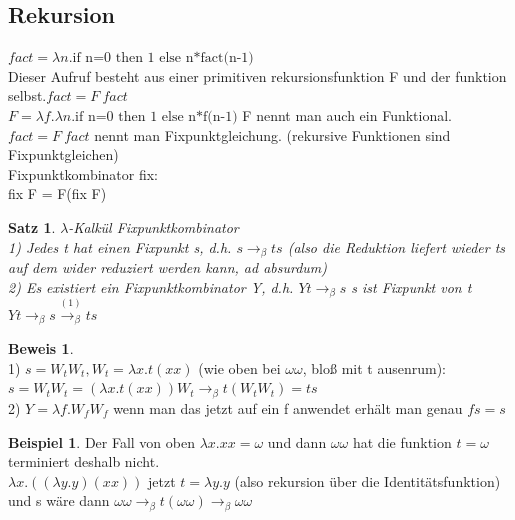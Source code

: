\documentclass{article}
\newtheorem{satz}{Satz}
\theoremstyle{definition}
\newtheorem{beweis}{Beweis}[section]
\newtheorem{beispiel}{Beispiel}[section]
\begin{document}
	\subsection{Rekursion}
	$fact =\lambda n. \text{if n=0 then 1 else n*fact(n-1)}$\\
	Dieser Aufruf besteht aus einer primitiven rekursionsfunktion F und der funktion selbst.$fact = F\ fact$\\
	$F=\lambda f.\lambda n. \text{if n=0 then 1 else n*f(n-1)}$ F nennt man auch ein Funktional.\\
	$fact = F\ fact$ nennt man Fixpunktgleichung. (rekursive Funktionen sind Fixpunktgleichen)\\
	Fixpunktkombinator fix:\\
	fix F = F(fix F)\\
	\begin{satz} $\lambda$-Kalkül Fixpunktkombinator\\
	1) Jedes t hat einen Fixpunkt s, d.h. $s\to_\beta ts$ (also die Reduktion liefert wieder ts auf dem wider reduziert werden kann, ad absurdum)\\
	2) Es existiert ein Fixpunktkombinator Y, d.h. $Yt\to_\beta s$ s ist Fixpunkt von t\\
	$Yt\to_\beta s\stackrel{(1)}{\to_\beta} ts$\\
	\end{satz}
	\begin{beweis} \ \\
	1) $s=W_tW_t, W_t = \lambda x.t(xx)$ (wie oben bei $\omega\omega$, bloß mit t ausenrum):\\
	$s=W_tW_t =(\lambda x.t(xx))W_t\to_\beta t(W_tW_t) = ts$\\
	2) $Y=\lambda f.W_fW_f$ wenn man das jetzt auf ein f anwendet erhält man genau $fs=s$
	\end{beweis}
	\begin{beispiel}
	Der Fall von oben $\lambda x.xx =\omega$ und dann $\omega\omega$ hat die funktion $t=\omega$ terminiert deshalb nicht.\\
	$\lambda x.((\lambda y.y)(xx))$ jetzt $t=\lambda y.y$ (also rekursion über die Identitätsfunktion) und s wäre dann $\omega\omega\to_\beta t(\omega\omega)\to_\beta \omega\omega$
	\end{beispiel}
\end{document}
